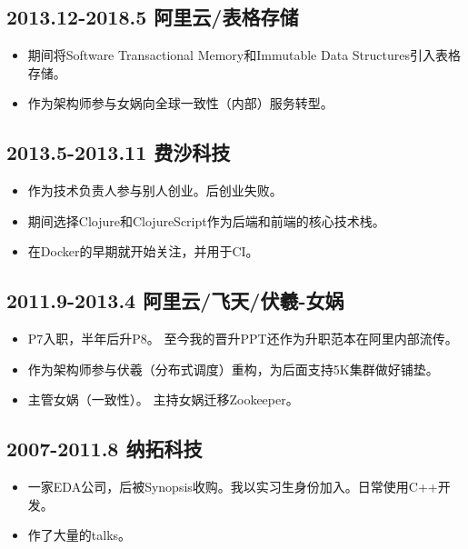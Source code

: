 \documentclass[scheme=plain]{ctexart}
\begin{document}
\subsection*{2013.12-2018.5 阿里云/表格存储}

\begin{itemize}
    \item 期间将Software Transactional Memory和Immutable Data Structures引入表格存储。
    \item 作为架构师参与女娲向全球一致性（内部）服务转型。
\end{itemize}

\subsection*{2013.5-2013.11 费沙科技}

\begin{itemize}
    \item 作为技术负责人参与别人创业。后创业失败。
    \item 期间选择Clojure和ClojureScript作为后端和前端的核心技术栈。
    \item 在Docker的早期就开始关注，并用于CI。
\end{itemize}

\subsection*{2011.9-2013.4 阿里云/飞天/伏羲-女娲}

\begin{itemize}
    \item P7入职，半年后升P8。
        至今我的晋升PPT还作为升职范本在阿里内部流传。
    \item 作为架构师参与伏羲（分布式调度）重构，为后面支持5K集群做好铺垫。
    \item 主管女娲（一致性）。
        主持女娲迁移Zookeeper。
\end{itemize}

\subsection*{2007-2011.8 纳拓科技}

\begin{itemize}
    \item 一家EDA公司，后被Synopsis收购。我以实习生身份加入。日常使用C++开发。
    \item 作了大量的talks。
\end{itemize}
\end{document}
